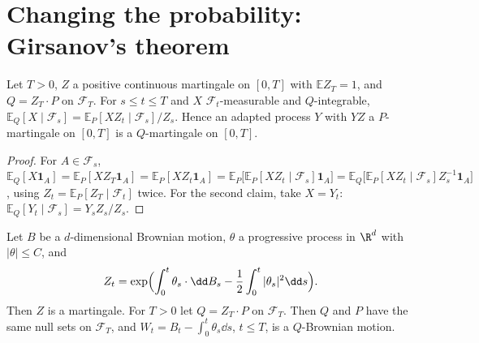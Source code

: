 \section{Changing the probability: Girsanov's theorem}

\begin{lemma}[Bayes]\label{lem:bayes}
Let $T>0$, $Z$ a positive continuous martingale on $[0,T]$ with $\mathbb EZ_T=1$, and $Q=Z_T\cdot P$ on $\mathcal F_T$. For $s\le t\le T$ and $X$ $\mathcal F_t$-measurable and $Q$-integrable,
$\mathbb E_Q[X\mid\mathcal F_s]=\mathbb E_P[XZ_t\mid\mathcal F_s]/Z_s$. Hence an adapted process $Y$ with $YZ$ a $P$-martingale on $[0,T]$ is a $Q$-martingale on $[0,T]$.
\end{lemma}

\begin{proof}
For $A\in\mathcal F_s$, $\mathbb E_Q[X\mathbf 1_A]=\mathbb E_P[XZ_T\mathbf 1_A]=\mathbb E_P[XZ_t\mathbf 1_A]=\mathbb E_P\bigl[\mathbb E_P[XZ_t\mid\mathcal F_s]\mathbf 1_A\bigr]=\mathbb E_Q\bigl[\mathbb E_P[XZ_t\mid\mathcal F_s]Z_s^{-1}\mathbf 1_A\bigr]$, using
$Z_t=\mathbb E_P[Z_T\mid\mathcal F_t]$ twice. For the second claim, take $X=Y_t$: $\mathbb E_Q[Y_t\mid\mathcal F_s]=Y_sZ_s/Z_s$.
\end{proof}

\begin{theorem}[Girsanov, 1960]\label{thm:girsanov}
Let $B$ be a $d$-dimensional Brownian motion, $\theta$ a progressive process in $\R^d$ with $|\theta|\le C$, and
\[
Z_t=\exp\Bigl(\int_0^t\theta_s\cdot\dd B_s-\frac12\int_0^t|\theta_s|^2\dd s\Bigr).
\]
Then $Z$ is a martingale. For $T>0$ let $Q=Z_T\cdot P$ on $\mathcal F_T$. Then $Q$ and $P$ have the same null sets on $\mathcal F_T$, and $W_t=B_t-\int_0^t\theta_s\dd s$, $t\le T$, is a $Q$-Brownian motion.
\end{theorem}

